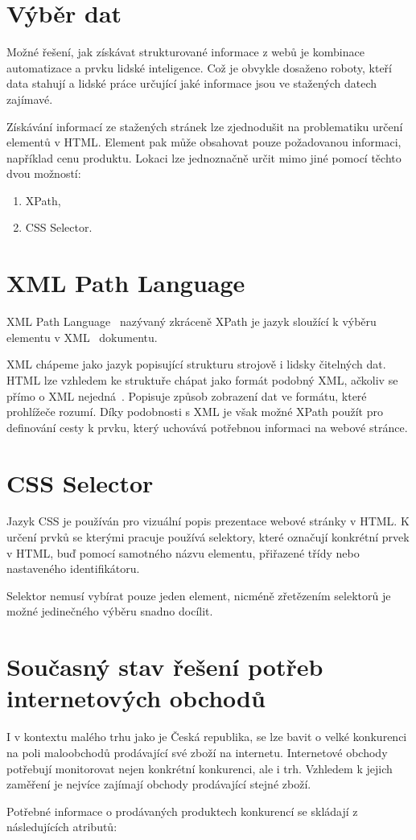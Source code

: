 \documentclass[thesis=B,czech]{FITthesis}[2012/06/26]
\begin{document}
\section{Výběr dat}
Možné řešení, jak získávat strukturované informace z webů je kombinace automatizace a prvku lidské inteligence.
Což je obvykle dosaženo roboty, kteří data stahují a lidské práce určující jaké informace jsou ve stažených datech zajímavé.
\par
Získávání informací ze stažených stránek lze zjednodušit na problematiku určení elementů v HTML.
Element pak může obsahovat pouze požadovanou informaci, například cenu produktu.
Lokaci lze jednoznačně určit mimo jiné pomocí těchto dvou možností:
\begin{enumerate}
\item XPath,
\item CSS Selector.
\end{enumerate}


\section{XML Path Language}
XML Path Language~\cite{XPath} nazývaný zkráceně XPath je jazyk sloužící k výběru elementu v  XML~\cite{XML} dokumentu.
\par
XML chápeme jako jazyk popisující strukturu strojově i lidsky čitelných dat.
HTML lze vzhledem ke struktuře chápat jako formát podobný XML, ačkoliv se přímo o XML nejedná~\cite{HTML}. 
Popisuje způsob zobrazení dat ve formátu, které prohlížeče rozumí.
Díky podobnosti s XML je však možné XPath použít pro definování cesty k prvku, který uchovává potřebnou informaci na webové stránce.
\par
\section{CSS Selector}
Jazyk CSS je používán pro vizuální popis prezentace webové stránky v HTML. K určení prvků se kterými
pracuje používá selektory, které označují konkrétní prvek v HTML, buď pomocí samotného názvu elementu, přiřazené třídy nebo nastaveného
identifikátoru.\cite{CSS}
\par
Selektor nemusí vybírat pouze jeden element, nicméně zřetězením selektorů je možné jedinečného výběru snadno docílit.

\newpage

\section{Současný stav řešení potřeb internetových obchodů}
I v kontextu malého trhu jako je Česká republika, se lze bavit o velké konkurenci na poli 
maloobchodů prodávající své zboží na internetu.
Internetové obchody potřebují monitorovat nejen konkrétní konkurenci, ale i trh. Vzhledem k jejich zaměření je nejvíce zajímají 
obchody prodávající stejné zboží. 
\par
Potřebné informace o prodávaných produktech konkurencí se skládají z následujících atributů:
\end{document}
